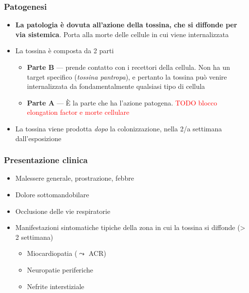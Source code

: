 \documentclass[italian,]{article}
\providecommand{\tightlist}{%
  \setlength{\itemsep}{0pt}\setlength{\parskip}{0pt}}
\newcommand{\TODO}[1]{\textcolor{red}{\textsf{\footnotesize{TODO #1}}}} %
\begin{document}
\hypertarget{patogenesi-6}{%
\subsubsection{Patogenesi}\label{patogenesi-6}}

\begin{itemize}
\tightlist
\item
  \textbf{La patologia è dovuta all'azione della tossina, che si
  diffonde per via sistemica}. Porta alla morte delle cellule in cui
  viene internalizzata
\item
  La tossina è composta da 2 parti

  \begin{itemize}
  \tightlist
  \item
    \textbf{Parte B} --- prende contatto con i recettori della cellula.
    Non ha un target specifico (\emph{tossina pantropa}), e pertanto la
    tossina può venire internalizzata da fondamentalmente qualsiasi tipo
    di cellula
  \item
    \textbf{Parte A} --- È la parte che ha l'azione patogena.
    \TODO{blocco elongation factor e morte cellulare}
  \end{itemize}
\item
  La tossina viene prodotta \emph{dopo} la colonizzazione, nella 2/a
  settimana dall'esposizione
\end{itemize}

\hypertarget{presentazione-clinica}{%
\subsubsection{Presentazione clinica}\label{presentazione-clinica}}

\begin{itemize}
\tightlist
\item
  Malessere generale, prostrazione, febbre
\item
  Dolore sottomandobilare
\item
  Occlusione delle vie respiratorie
\item
  Manifestazioni sintomatiche tipiche della zona in cui la tossina si
  diffonde (\textgreater{} 2 settimana)

  \begin{itemize}
  \tightlist
  \item
    Miocardiopatia (\(\leadsto\) ACR)
  \item
    Neuropatie periferiche
  \item
    Nefrite interstiziale
  \end{itemize}
\end{itemize}
\end{document}
